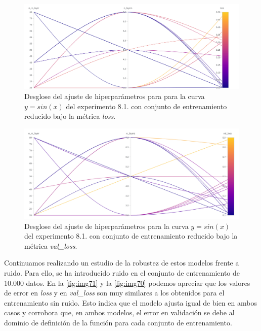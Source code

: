 \begin{figure}[htbp]
    \centering
    \includegraphics[width=1\textwidth]{img/img77.png}
    \caption{Desglose del ajuste de hiperparámetros para para la curva $y=sin(x)$ del experimento 8.1. con conjunto de entrenamiento reducido bajo la métrica \textit{loss}.}
    \label{fig:img77}
\end{figure}

\begin{figure}[htbp]
    \centering
    \includegraphics[width=1\textwidth]{img/img76.png}
    \caption{Desglose del ajuste de hiperparámetros para la curva $y=sin(x)$ del experimento 8.1. con conjunto de entrenamiento reducido bajo la métrica \textit{val\_loss}.} 
    \label{fig:img76}
\end{figure}

Continuamos realizando un estudio de la robustez de estos modelos frente a ruido. Para ello, se ha introducido ruido en el conjunto de entrenamiento de 10.000 datos. En la \autoref{fig:img71} y la \autoref{fig:img70} podemos apreciar que los valores de error en \textit{loss} y en \textit{val\_loss} son muy similares a los obtenidos para el entrenamiento sin ruido. Esto indica que el modelo ajusta igual de bien en ambos casos y corrobora que, en ambos modelos, el error en validación se debe al dominio de definición de la función para cada conjunto de entrenamiento. 

